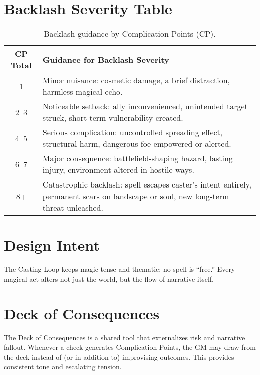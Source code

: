 \documentclass[12pt]{book}
\begin{document}
\section{Backlash Severity Table}

\begin{table}[h!]
\centering
\begin{tabular}{|c|p{10cm}|}
\hline
\textbf{CP Total} & \textbf{Guidance for Backlash Severity} \\
\hline
1 & Minor nuisance: cosmetic damage, a brief distraction, harmless magical echo. \\
\hline
2--3 & Noticeable setback: ally inconvenienced, unintended target struck, short-term vulnerability created. \\
\hline
4--5 & Serious complication: uncontrolled spreading effect, structural harm, dangerous foe empowered or alerted. \\
\hline
6--7 & Major consequence: battlefield-shaping hazard, lasting injury, environment altered in hostile ways. \\
\hline
8+ & Catastrophic backlash: spell escapes caster’s intent entirely, permanent scars on landscape or soul, new long-term threat unleashed. \\
\hline
\end{tabular}
\caption{Backlash guidance by Complication Points (CP).}
\end{table}

\section{Design Intent}
The Casting Loop keeps magic tense and thematic: no spell is “free.”  
Every magical act alters not just the world, but the flow of narrative itself.

\section{Deck of Consequences}

The Deck of Consequences is a shared tool that externalizes risk and narrative fallout. 
Whenever a check generates Complication Points, the GM may draw from the deck instead of (or in addition to) improvising outcomes. 
This provides consistent tone and escalating tension.
\end{document}
